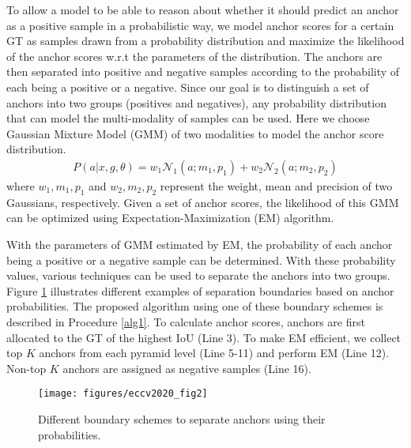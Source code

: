 \documentclass[runningheads]{llncs}
\begin{document}
To allow a model to be able to reason about whether it should predict an anchor as a positive sample in a probabilistic way, we model anchor scores for a certain GT as samples drawn from a probability distribution and maximize the likelihood of the anchor scores w.r.t the parameters of the distribution. The anchors are then separated into positive and negative samples according to the probability of each being a positive or a negative. Since our goal is to distinguish a set of anchors into two groups (positives and negatives), any probability distribution that can model the multi-modality of samples can be used. Here we choose Gaussian Mixture Model (GMM) of two modalities to model the anchor score distribution. 
\begin{align}
P(a|x,g,\theta) = w_{1}\mathcal{N}_{1}(a;m_1,p_1) + w_{2}\mathcal{N}_{2}(a;m_2,p_2)
\end{align}
where $w_1, m_1, p_1$ and $w_2, m_2, p_2$ represent the weight, mean and precision of two Gaussians, respectively. Given a set of anchor scores, the likelihood of this GMM can be optimized using Expectation-Maximization (EM) algorithm.

With the parameters of GMM estimated by EM, the probability of each anchor being a positive or a negative sample can be determined. With these probability values, various techniques can be used to separate the anchors into two groups. Figure \ref{fig2} illustrates different examples of separation boundaries based on anchor probabilities. The proposed algorithm using one of these boundary schemes is described in Procedure \ref{alg1}.  To calculate anchor scores, anchors are first allocated to the GT of the highest IoU (Line 3). To make EM efficient, we collect top $K$ anchors from each pyramid level (Line 5-11) and perform EM (Line 12). Non-top $K$ anchors are assigned as negative samples (Line 16). 
\begin{figure}[t]
	\begin{center}
		\texttt{[image: figures/eccv2020\_fig2]}
	\end{center}
	\caption{Different boundary schemes to separate anchors using their probabilities.}
	\label{fig2}
\end{figure}
\end{document}
